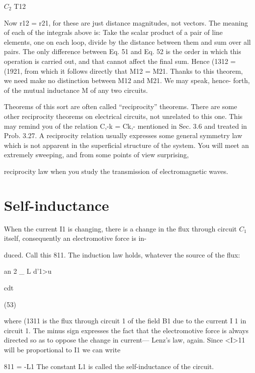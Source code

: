 $C_2$ T12

Now r12 = r21, for these are just distance magnitudes, not vectors.
The meaning of each of the integrals above is: Take the scalar product
of a pair of line elements, one on each loop, divide by the distance
between them and sum over all pairs. The only difference between
Eq. 51 and Eq. 52 is the order in which this operation is carried out,
and that cannot affect the final sum. Hence (1312 = (1921, from which
it follows directly that M12 = M21. Thanks to this theorem, we need
make no distinction between M12 and M21. We may speak, hence-
forth, of the mutual inductance M of any two circuits.

Theorems of this sort are often called ``reciprocity'' theorems.
There are some other reciprocity theorems on electrical circuits, not
unrelated to this one. This may remind you of the relation C,-k = Ck,-
mentioned in Sec. 3.6 and treated in Prob. 3.27. A reciprocity relation
usually expresses some general symmetry law which is not apparent
in the superficial structure of the system. You will meet an
extremely sweeping, and from some points of view surprising,

reciprocity law when you study the transmission of electromagnetic
waves.

\section{Self-inductance}
When the current I1 is changing, there is a change in the flux
through circuit $C_1$ itself, consequently an electromotive force is in-

duced. Call this 811. The induction law holds, whatever the source
of the flux:

\begin{equation}
\end{equation}
an 2 _ L d'1>u

cdt

(53)

where (1311 is the flux through circuit 1 of the field B1 due to the current
I 1 in circuit 1. The minus sign expresses the fact that the electromotive
force is always directed so as to oppose the change in current---
Lenz's law, again. Since <I>11 will be proportional to I1 we can write

\begin{equation}
\end{equation}
811 = -L1 %
The constant L1 is called the self-inductance of the circuit.

